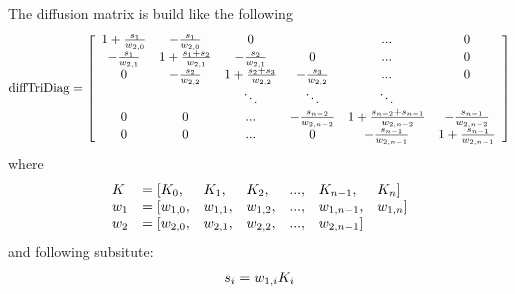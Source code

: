 \documentclass[a4paper,10pt,english]{sphinxmanual}
\begin{document}
\begin{fulllineitems}
The diffusion matrix is build like the following
\begin{gather}
\begin{split}\textrm{diffTriDiag}= 
\left[ \begin{array}{cccccc}
1+\frac{s_1 }{w_{2,0}} & -\frac{s_1}{w_{2,0}} & 0 &  & ... & 0  \\
-\frac{s_1}{w_{2,1}} & 1+\frac{s_1 + s_2}{w_{2,1}} & -\frac{s_2}{w_{2,1}} & 0 & ... & 0 \\
0 & -\frac{s_2}{w_{2,2}}  & 1+\frac{s_2 + s_3}{w_{2,2}} & -\frac{s_3}{w_{2,2}} &... & 0  \\
  &  & \ddots & \ddots & \ddots & \\
0 & 0 & ... & -\frac{s_{n-2}}{w_{2,n-2}}  & 1+\frac{s_{n-2} + s_{n-1}}{w_{2,{n-2}}} & -\frac{s_{n-1}}{w_{2,{n-2}}} \\
0 & 0 & ... & 0 & -\frac{s_{n-1}}{w_{2,n-1}}  & 1+\frac{s_{n-1}}{w_{2,n-1}} \\
\end{array} \right] \end{split}\notag
\end{gather}
where
\begin{gather}
\begin{split}\begin{array}{lllllll}
     K   &= [K_0,     &K_1,    &K_2,    &...,&K_{n-1},  &K_{n}] \\
     w_1 &= [w_{1,0}, &w_{1,1},&w_{1,2},&...,&w_{1,n-1},&w_{1,n}] \\
     w_2 &= [w_{2,0}, &w_{2,1},&w_{2,2},&...,&w_{2,n-1}]
\end{array}    \end{split}\notag
\end{gather}
and following subsitute:
\begin{gather}
\begin{split}s_i = w_{1,i} K_i        \end{split}\notag
\end{gather}
\end{fulllineitems}

\end{document}
